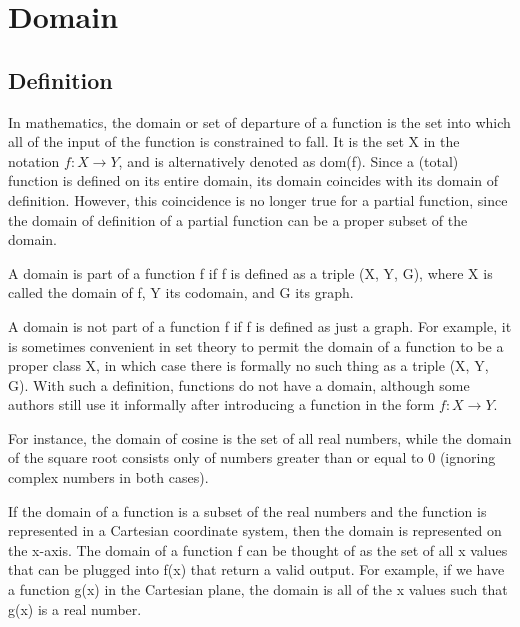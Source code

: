 \section{Domain}
\label{sec:doma-ad5f}



\subsection{Definition}
\label{sss:defi-3061}




In mathematics, the domain or set of departure of a function is the set into which all of
the input of the function is constrained to fall. It is the set X in the notation $f: X
\rightarrow Y$, and is alternatively denoted as dom(f). Since a (total) function is
defined on its entire domain, its domain coincides with its domain of definition. However,
this coincidence is no longer true for a partial function, since the domain of definition
of a partial function can be a proper subset of the domain.



A domain is part of a function f if f is defined as a triple (X, Y, G), where X is called
the domain of f, Y its codomain, and G its graph.



A domain is not part of a function f if f is defined as just a graph. For example, it is
sometimes convenient in set theory to permit the domain of a function to be a proper class
X, in which case there is formally no such thing as a triple (X, Y, G). With such a
definition, functions do not have a domain, although some authors still use it informally
after introducing a function in the form $f: X \rightarrow Y$.



For instance, the domain of cosine is the set of all real numbers, while the domain of the
square root consists only of numbers greater than or equal to 0 (ignoring complex numbers
in both cases).



If the domain of a function is a subset of the real numbers and the function is
represented in a Cartesian coordinate system, then the domain is represented on the
x-axis. The domain of a function f can be thought of as the set of all x values that can
be plugged into f(x) that return a valid output. For example, if we have a function g(x)
in the Cartesian plane, the domain is all of the x values such that g(x) is a real number.



